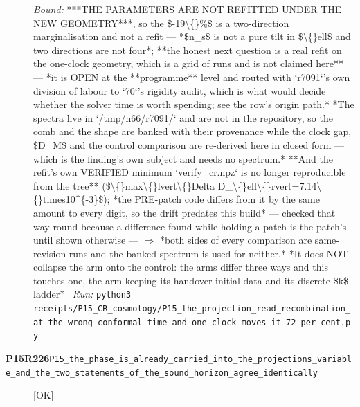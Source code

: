 \begin{description}
 \emph{Bound:}  ***THE PARAMETERS ARE NOT REFITTED UNDER THE NEW GEOMETRY***, so the \$-19\textbackslash\{\}\%\$ is a two-direction marginalisation and not a refit --- *\$n\_s\$ is not a pure tilt in \$\textbackslash\{\}ell\$ and two directions are not four*; **the honest next question is a real refit on the one-clock geometry, which is a grid of runs and is not claimed here** --- *it is OPEN at the **programme** level and routed with `r7091`'s own division of labour to `70`'s rigidity audit, which is what would decide whether the solver time is worth spending; see the row's origin path.*  *The spectra live in `/tmp/n66/r7091/` and are not in the repository, so the comb and the shape are banked with their provenance while the clock gap, \$D\_M\$ and the control comparison are re-derived here in closed form --- which is the finding's own subject and needs no spectrum.*  **And the refit's own VERIFIED minimum `verify\_cr.npz` is no longer reproducible from the tree** (\$\textbackslash\{\}max\textbackslash\{\}lvert\textbackslash\{\}Delta D\_\textbackslash\{\}ell\textbackslash\{\}rvert=7.14\textbackslash\{\}times10\textasciicircum{}\{-3\}\$); *the PRE-patch code differs from it by the same amount to every digit, so the drift predates this build* --- checked that way round because a difference found while holding a patch is the patch's until shown otherwise --- \ensuremath{\Rightarrow} *both sides of every comparison are same-revision runs and the banked spectrum is used for neither.*  *It does NOT collapse the arm onto the control: the arms differ three ways and this touches one, the arm keeping its handover initial data and its discrete \$k\$ ladder*
\ \emph{Run:} \texttt{python3 receipts/P15\_CR\_cosmology/P15\_the\_projection\_read\_recombination\_at\_the\_wrong\_conformal\_time\_and\_one\_clock\_moves\_it\_72\_per\_cent.py}
\item[\rcptlabel{P15_the_phase_is_already_carried_into_the_projections_variable_and_the_two_statements_of_the_sound_horizon_agree_identically}{P15R226}\textbf{P15R226}\quad\texttt{P15\_the\_phase\_is\_already\_carried\_into\_the\_projections\_variable\_and\_the\_two\_statements\_of\_the\_sound\_horizon\_agree\_identically}]\hfill\textsf{[OK]}\\

\end{description}
